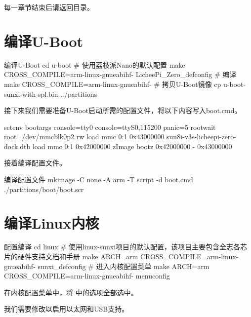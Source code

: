 \documentclass[lang=cn,newtx,10pt,scheme=chinese]{elegantbook}
\begin{document}
每一章节结束后请返回目录。

\section{编译U-Boot}

\begin{mycode}{编译U-Boot}
cd u-boot
# 使用荔枝派Nano的默认配置
make CROSS_COMPILE=arm-linux-gnueabihf- LicheePi_Zero_defconfig
# 编译
make CROSS_COMPILE=arm-linux-gnueabihf-
# 拷贝U-Boot镜像
cp u-boot-sunxi-with-spl.bin ../partitions
\end{mycode}

接下来我们需要准备U-Boot启动所需的配置文件，将以下内容写入boot.cmd。

\begin{mycode}
setenv bootargs console=tty0 console=ttyS0,115200 panic=5 rootwait root=/dev/mmcblk0p2 rw
load mmc 0:1 0x43000000 sun8i-v3s-licheepi-zero-dock.dtb
load mmc 0:1 0x42000000 zImage
bootz 0x42000000 - 0x43000000
\end{mycode}

接着编译配置文件。

\begin{mycode}{编译配置文件}
mkimage -C none -A arm -T script -d boot.cmd ./partitions/boot/boot.scr
\end{mycode}

\section{编译Linux内核}

\begin{mycode}{配置编译}
cd linux
# 使用linux-sunxi项目的默认配置，该项目主要包含全志各芯片的硬件支持文档和手册
make ARCH=arm CROSS_COMPILE=arm-linux-gnueabihf- sunxi_defconfig
# 进入内核配置菜单
make ARCH=arm CROSS_COMPILE=arm-linux-gnueabihf- menuconfig
\end{mycode}

\begin{marker}
    在内核配置菜单中，将  中的选项全部选中。
\end{marker}

我们需要修改以启用以太网和USB支持。
\end{document}
